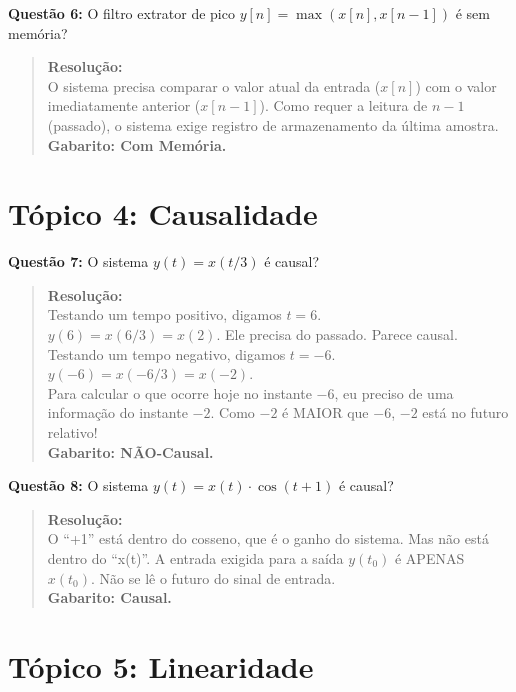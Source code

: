 \textbf{Questão 6:} O filtro extrator de pico \(y[n] = \max(x[n], x[n-1])\) é sem memória?

\begin{quote}
\textbf{Resolução:}\\
O sistema precisa comparar o valor atual da entrada (\(x[n]\)) com o valor imediatamente anterior (\(x[n-1]\)). Como requer a leitura de \(n-1\) (passado), o sistema exige registro de armazenamento da última amostra.\\
\textbf{Gabarito: Com Memória.}
\end{quote}

\section{Tópico 4: Causalidade}\label{tuxf3pico-4-causalidade}

\textbf{Questão 7:} O sistema \(y(t) = x(t/3)\) é causal?

\begin{quote}
\textbf{Resolução:}\\
Testando um tempo positivo, digamos \(t=6\).\\
\(y(6) = x(6/3) = x(2)\). Ele precisa do passado. Parece causal.\\
Testando um tempo negativo, digamos \(t=-6\).\\
\(y(-6) = x(-6/3) = x(-2)\).\\
Para calcular o que ocorre hoje no instante \(-6\), eu preciso de uma informação do instante \(-2\). Como \(-2\) é MAIOR que \(-6\), \(-2\) está no futuro relativo!\\
\textbf{Gabarito: NÃO-Causal.}
\end{quote}

\textbf{Questão 8:} O sistema \(y(t) = x(t) \cdot \cos(t+1)\) é causal?

\begin{quote}
\textbf{Resolução:}\\
O ``+1'' está dentro do cosseno, que é o ganho do sistema. Mas não está dentro do ``x(t)''. A entrada exigida para a saída \(y(t_0)\) é APENAS \(x(t_0)\). Não se lê o futuro do sinal de entrada.\\
\textbf{Gabarito: Causal.}
\end{quote}

\section{Tópico 5: Linearidade}\label{tuxf3pico-5-linearidade}

